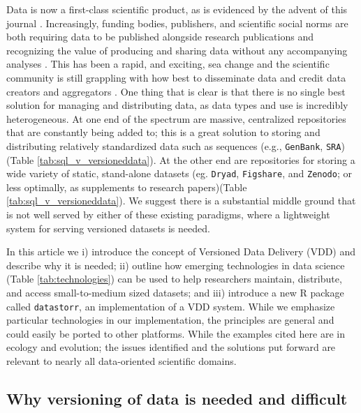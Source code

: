 \documentclass[a4paper,11pt]{article}
\begin{document}
Data is now a first-class scientific product, as is evidenced by the advent of this journal \cite{Editorial-2014}. Increasingly, funding bodies, publishers, and scientific social norms are both requiring data to be published alongside research publications and recognizing the value of producing and sharing data without any accompanying analyses \cite[e.g.][]{Whitlock-2011,Fairbairn-2011,Piwowar-2011,VanNoorden-2013,Gibney-2013}. This has been a rapid, and exciting, sea change and the scientific community is still grappling with how best to disseminate data and credit data creators and aggregators \cite{Whitlock-2011, Goodman-2014, Lowndes-2017,Perkel-2016,VanNoorden-2013}. One thing that is clear is that there is no single best solution for managing and distributing data, as data types and use is incredibly heterogeneous. At one end of the spectrum are massive, centralized repositories that are constantly being added to; this is a great solution to storing and distributing relatively standardized data such as sequences (e.g., \texttt{GenBank}, \texttt{SRA}) (Table \ref{tab:sql_v_versioneddata}). At the other end are repositories for storing a wide variety of static, stand-alone datasets (eg. \texttt{Dryad}, \texttt{Figshare}, and \texttt{Zenodo}; or less optimally, as supplements to research papers)(Table \ref{tab:sql_v_versioneddata}). We suggest there is a substantial middle ground that is not well served by either of these existing paradigms, where a lightweight system for serving versioned datasets is needed.

In this article we i) introduce the concept of Versioned Data Delivery (VDD) and describe why it is needed; ii) outline how emerging technologies in data science (Table \ref{tab:technologies}) can be used to help researchers maintain, distribute, and access small-to-medium sized datasets; and iii) introduce a new R package called \texttt{datastorr}, an implementation of a VDD system. While we emphasize particular technologies in our implementation, the principles are general and could easily be ported to other platforms. While the examples cited here are in ecology and evolution; the issues identified and the solutions put forward are relevant to nearly all data-oriented scientific domains.

\subsection{Why versioning of data is needed and difficult}
\end{document}
